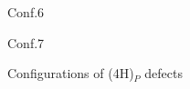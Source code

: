 \begin{figure}[h]
\begin{minipage}[h]{0.3\linewidth}
\end{minipage}
\hfill
\begin{minipage}[h]{0.3\linewidth}
 Conf.6 \\
\end{minipage}
\vfill
\begin{minipage}[h]{0.3\linewidth}
\end{minipage}
\hfill
\begin{minipage}[h]{0.9\linewidth}
 Conf.7 \\
\end{minipage}
\caption{Configurations of (4H)$_{P}$ defects}
\label{pvac7}
\end{figure}

